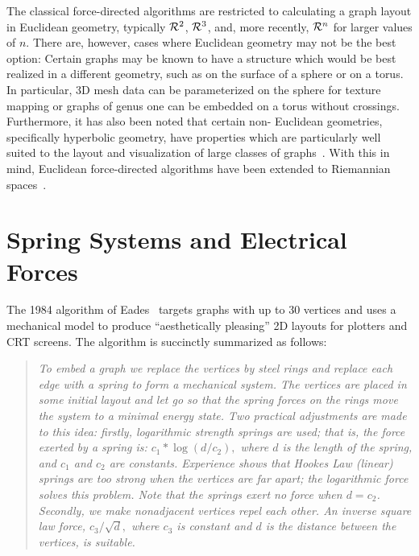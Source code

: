 \documentclass[notitlepage,letter,11pt]{article}
\begin{document}
The classical force-directed algorithms are restricted to calculating
a graph layout in Euclidean geometry, typically ${\cal{R}}^2$,
${\cal{R}}^3$, and, more recently, ${\cal{R}}^n$ for larger values of
$n$. There are, however, cases where Euclidean geometry may not be the
best option: Certain graphs may be known to have a structure which
would be best realized in a different geometry, such as on the surface
of a sphere or on a torus. In particular, 3D mesh data can be
parameterized on the sphere for texture mapping or graphs of genus one
can be embedded on a torus without crossings.  Furthermore, it has
also been noted that certain non- Euclidean geometries, specifically
hyperbolic geometry, have properties which are particularly well
suited to the layout and visualization of large classes of
graphs~\cite{EVL-1995-206,Munzner+1997a}. With this in mind, Euclidean force-directed algorithms have been extended to Riemannian spaces~\cite{kw-nese-05}.






\section{Spring Systems and Electrical Forces}
\label{fd:sec:fr}


The 1984 algorithm of Eades~\cite{Eades+1984a} targets graphs with up
to 30 vertices and uses a mechanical model to produce ``aesthetically
pleasing'' 2D layouts for plotters and CRT screens. The algorithm is
succinctly summarized as follows:

\begin{quote}
{\em To embed a graph we replace the vertices by steel rings and
replace each edge with a spring to form a mechanical system. The
vertices are placed in some initial layout and let go so that the
spring forces on the rings move the system to a minimal energy
state. Two practical adjustments are made to this idea: firstly,
logarithmic strength springs are used; that is, the force exerted by a
spring is: $c_1* \log(d/c_2),$ where $d$ is the length of the
spring, and $c_1$ and $c_2$ are constants. Experience shows that
Hookes Law (linear) springs are too strong when the vertices are far
apart; the logarithmic force solves this problem. Note that the springs
exert no force when $d=c_2$. Secondly, we make nonadjacent vertices
repel each other. An inverse square law force, $c_3/\sqrt{d},$ where
$c_3$ is constant and $d$ is the distance between the vertices, is
suitable.}
\end{quote}
\end{document}
